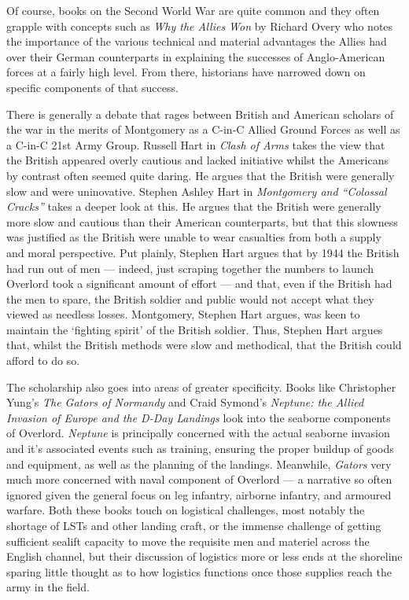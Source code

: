 \documentclass[noraggedright]{turabian-researchpaper}
\begin{document}
Of course, books on the Second World War are quite common and they often
grapple with concepts such as \textit{Why the Allies Won} by Richard Overy
who notes the importance of the various technical and material advantages the 
Allies had over their German counterparts in explaining the successes of 
Anglo-American forces at a fairly high level.%
From there, historians have narrowed down on specific components of that
success.  

There is generally a debate that rages between British and American scholars
of the war in the merits of Montgomery as a C-in-C Allied Ground Forces as
well as a C-in-C 21st Army Group.  Russell Hart in \textit{Clash of Arms} takes
the view that the British appeared overly cautious and lacked initiative whilst 
the Americans by contrast often seemed quite daring.%
He argues that the British were generally slow and
were uninovative.  Stephen Ashley Hart in \textit{Montgomery and ``Colossal
Cracks''} takes a deeper look at this.  He argues that the British were 
generally more slow and cautious than their American counterparts, but that 
this slowness was justified as the British were unable to wear casualties from
both a supply and moral perspective.  Put plainly, Stephen Hart argues that by 
1944 the British had run out of men --- indeed, just scraping together the 
numbers to launch Overlord took a significant amount of effort\autocite[56-7]
{cracks}
--- and that, even if the British had the men to spare, the British soldier 
and public would not accept what they 
viewed as needless losses.\autocite[24-5]{cracks}  
Montgomery, Stephen Hart argues, was keen to maintain the `fighting spirit'
of the British soldier.  Thus, Stephen Hart argues that, whilst the British
methods were slow and methodical, that the British could afford to do so.  

The scholarship also goes into areas of greater specificity.  Books like 
Christopher Yung's \textit{The Gators of Normandy} and Craid Symond's 
\textit{Neptune: the Allied Invasion of Europe and the D-Day Landings} 
look into the seaborne components of Overlord.  \textit{Neptune} is 
principally concerned with the actual seaborne invasion and it's associated
events such as training, ensuring the proper buildup of goods and equipment, 
as well as the planning of the landings.\autocite[xvi-xvii]{neptune}  
Meanwhile, \textit{Gators} very much more concerned with naval component of 
Overlord --- a narrative so often ignored given the general focus on leg 
infantry, airborne infantry, and armoured warfare. %
Both these books touch on logistical challenges, most notably the shortage
of LSTs and other landing craft, or the immense challenge of getting 
sufficient sealift capacity to move the requisite men and materiel across
the English channel, but their discussion of logistics more or less ends
at the shoreline sparing little thought as to how logistics functions once
those supplies reach the army in the field.
\end{document}
